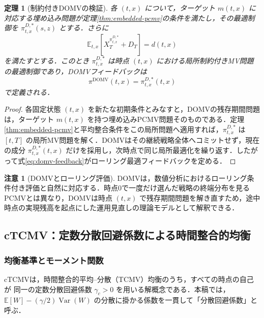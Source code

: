 \documentclass[10pt,a4paper]{article}
\theoremstyle{plain}
\newtheorem{theorem}{定理}
\theoremstyle{definition}
\newtheorem{remark}{注意}
\newcommand{\E}{\mathbb{E}}
\DeclareMathOperator{\Var}{Var}
\begin{document}
\begin{theorem}[制約付きDOMVの検証]
\label{thm:domv}
各 $(t,x)$ について，ターゲット $m(t,x)$ に対応する埋め込み問題が定理\ref{thm:embedded-pcmv}の条件を満たし，その最適制御を $\pi^{D,*}_{t,x}(s,z)$ とする．さらに
\[
  \E_{t,x}[X_T^{\pi^{D,*}_{t,x}}+D_T]=d(t,x)
\]
を満たすとする．このとき $\pi^{D,*}_{t,x}$ は時点 $(t,x)$ における局所制約付きMV問題の最適制御であり，DOMVフィードバックは
\begin{equation}
  \pi^{\mathrm{DOMV}}(t,x)=\pi^{D,*}_{t,x}(t,x)
  \label{eq:domv-feedback}
\end{equation}
で定義される．
\end{theorem}

\begin{proof}
各固定状態 $(t,x)$ を新たな初期条件とみなすと，DOMVの残存期間問題は，ターゲット $m(t,x)$ を持つ埋め込みPCMV問題そのものである．定理\ref{thm:embedded-pcmv}と平均整合条件をこの局所問題へ適用すれば，$\pi^{D,*}_{t,x}$ は $[t,T]$ の局所MV問題を解く．DOMVはその継続戦略全体へコミットせず，現在の成分 $\pi^{D,*}_{t,x}(t,x)$ だけを採用し，次時点で同じ局所最適化を繰り返す．したがって式\eqref{eq:domv-feedback}がローリング最適フィードバックを定める．
\end{proof}

\begin{remark}[DOMVとローリング評価]
DOMVは，数値分析におけるローリング条件付き評価と自然に対応する．時点0で一度だけ選んだ戦略の終端分布を見るPCMVとは異なり，DOMVは時点 $(t,x)$ で残存期間問題を解き直すため，途中時点の実現残高を起点にした運用見直しの理論モデルとして解釈できる．
\end{remark}

\subsection{cTCMV：定数分散回避係数による時間整合的均衡}
\label{sec:ctcmv}

\subsubsection{均衡基準とモーメント関数}

cTCMVは，時間整合的平均--分散（TCMV）均衡のうち，すべての時点の自己が
同一の定数分散回避係数 $\gamma_c>0$ を用いる解概念である\citep{BasakChabakauri2010,BjorkKhapkoMurgoci2017,vanStadenDangForsyth2021}．本稿では，$\E[W]-(\gamma/2)\Var(W)$ の分散に掛かる係数を一貫して「分散回避係数」と呼ぶ．
\end{document}
